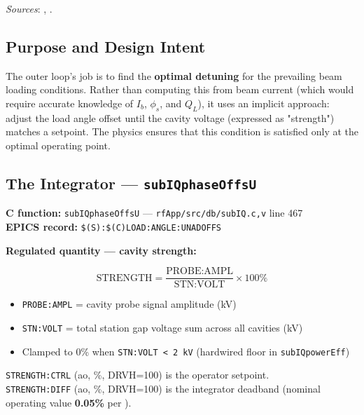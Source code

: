 \emph{Sources}: , .


\subsection{Purpose and Design Intent}\label{sec:outer-intent}


The outer loop's job is to find the \textbf{optimal detuning} for the prevailing beam loading conditions. Rather than computing this from beam current (which would require accurate knowledge of \(I_b\), \(\phi_s\), and \(Q_L\)), it uses an implicit approach: adjust the load angle offset until the cavity voltage (expressed as "strength") matches a setpoint. The physics ensures that this condition is satisfied only at the optimal operating point.

\subsection{\texorpdfstring{The Integrator --- \texttt{subIQphaseOffsU}}{The Integrator --- subIQphaseOffsU}}\label{sec:outer-integrator}


\textbf{C function:} \texttt{subIQphaseOffsU} --- \texttt{rfApp/\allowbreak{}src/\allowbreak{}db/\allowbreak{}subIQ.\allowbreak{}c,\allowbreak{}v} line 467 \\
\textbf{EPICS record:} \texttt{\$(S):\allowbreak{}\$(C)LOAD:\allowbreak{}ANGLE:\allowbreak{}UNADOFFS}

\textbf{Regulated quantity --- cavity strength:}

\begin{equation}\label{eq:strength}
  \text{STRENGTH} = \frac{\text{PROBE:AMPL}}{\text{STN:VOLT}} \times 100\%
\end{equation}

\begin{itemize}
\tightlist
\item
  \texttt{PROBE:AMPL} = cavity probe signal amplitude (kV)
\item
  \texttt{STN:VOLT} = total station gap voltage sum across all cavities (kV)
\item
  Clamped to 0\% when \texttt{STN:\allowbreak{}VOLT\ \textless{}\ 2\ kV} (hardwired floor in \texttt{subIQpowerEff})
\end{itemize}

\texttt{STRENGTH:CTRL} (ao, \%, DRVH=100) is the operator setpoint.\\
\texttt{STRENGTH:DIFF} (ao, \%, DRVH=100) is the integrator deadband (nominal operating value \textbf{0.05\%} per ).

